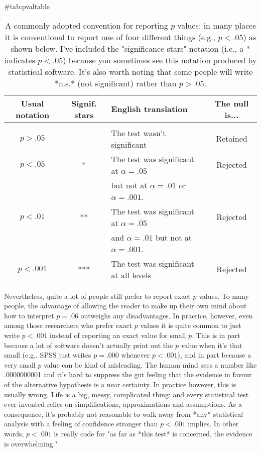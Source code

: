 \begin{table}
\begin{center}
\caption{A commonly adopted convention for reporting $p$ values: in many places it is conventional to report one of four different things (e.g., $p<.05$) as shown below. I've included the "significance stars" notation (i.e., a * indicates $p<.05$) because you sometimes see this notation produced by statistical software. It's also worth noting that some people will write *n.s.* (not significant) rather than $p>.05$.} \vspace*{12pt}
{#tab:pvaltable}
\begin{tabular}{c|c|l|c} 
Usual notation & 
Signif. stars & 
English translation & 
The null is... \\[3pt] \hline
&&&\\[-6pt]
$p>.05$ &  & The test wasn't significant &   Retained\\[6pt] %
$p<.05$ & * & The test was significant at $\alpha = .05$  & Rejected \\
        &   & but not at  $\alpha =.01$ or $\alpha = .001$. & \\[6pt] %

$p<.01$ & **  &The test was significant at $\alpha = .05$  & Rejected \\
        &   &and $\alpha = .01$ but not at  $\alpha = .001$. & \\[6pt] %

$p<.001$ & *** & The test was significant at all levels  & Rejected \\ %
 \end{tabular}\tabcapsep
 \HR
 \end{center}
 \end{table} 

Nevertheless, quite a lot of people still prefer to report exact $p$ values. To many people, the advantage of allowing the reader to make up their own mind about how to interpret $p = .06$ outweighs any disadvantages. In practice, however, even among those researchers who prefer exact $p$ values it is quite common to just write $p<.001$ instead of reporting an exact value for small $p$. This is in part because a lot of software doesn't actually print out the $p$ value when it's that small (e.g., SPSS just writes $p = .000$ whenever $p<.001$), and in part because a very small $p$ value can be kind of misleading. The human mind sees a number like .0000000001 and it's hard to suppress the gut feeling that the evidence in favour of the alternative hypothesis is a near certainty. In practice however, this is usually wrong. Life is a big, messy, complicated thing: and every statistical test ever invented relies on simplifications, approximations and assumptions. As a consequence, it's probably not reasonable to walk away from *any* statistical analysis with a feeling of confidence stronger than $p<.001$ implies. In other words, $p<.001$ is really code for "as far as *this test* is concerned, the evidence is overwhelming." 

